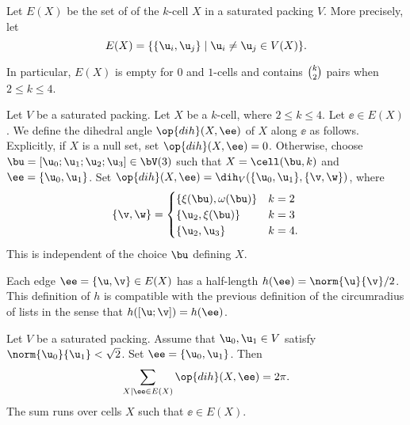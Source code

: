 
\begin{definition}[edge]
  Let $E(X)$ be the set of  of the $k$-cell
  $X$ in a saturated packing $V$.  More precisely, let
\[ E(X)=\{\{ \u_i, \u_j\}\mid \u_i\ne \u_j\in
V( X)\}.\] 
%
\end{definition}

In particular, $E(X)$ is empty for $0$ and $1$-cells and contains
$\tbinom{k}{2}$ pairs when $2\le k\le 4$.

\begin{definition}[$\op{dih}$] \label{def:dihX}
Let $V$ be a saturated packing.  Let $X$ be
  a $k$-cell, where $2\le k\le 4$.  Let $\ee\in E(X)$.  We define the
  dihedral angle $\op{dih}(X,\ee)$ of $X$ along $\ee$ as follows.
  Explicitly, if $X$ is a null set, set
  $\op{dih}(X,\ee)=0$. Otherwise, choose $\bu=[\u_0;\u_1;\u_2;\u_3]\in
  \bV(3)$ such that $X=\cell(\bu,k)$ and $\ee=\{\u_0,\u_1\}$.  Set
  $\op{dih}(X,\ee)=\dih_V(\{\u_0,\u_1\},\{\v,\w\})$, where
\[
\{\v,\w\} = 
\begin{cases}
  \{\xi(\bu),\omega(\bu) \} &  k=2\\
  \{\u_2,\xi(\bu)\} & k=3\\
  \{\u_2,\u_3\} &k=4.
\end{cases}
\]
This is independent of the choice $\bu$ defining $X$.
%
%
\end{definition}

Each
edge $\ee=\{ \u, \v\}\in E(X)$ has a half-length
$h(\ee) = \norm{ \u}{ \v}/2$.
This definition of $h$ is compatible with the previous definition of the circumradius
of lists in the sense that
$h([\u;\v]) = h(\ee)$.

\begin{lemma}
  Let $V$ be a saturated packing.  Assume that $\u_0,\u_1\in V$
  satisfy $\norm{\u_0}{\u_1}<\sqrt2$.  Set $\ee=\{\u_0,\u_1\}$.  Then
\[
\sum_{X\mid \ee\in E(X) } \op{dih}(X,\ee) = 2\pi.
\]
The sum runs over cells $X$ such that $\ee\in E(X)$.
\end{lemma}

